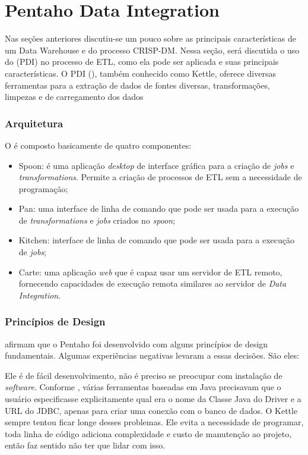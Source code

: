 \section{Pentaho Data Integration}
Nas seções anteriores discutiu-se um pouco sobre as principais características de um Data Warehouse e do processo CRISP-DM. Nessa seção, será discutida o uso do \pdi (PDI) no processo de ETL, como ela pode ser aplicada e suas principais características.
O PDI (\textit{\pdi}), também conhecido como Kettle, oferece diversas ferramentas para a extração de dados de fontes diversas, transformações, limpezas e de carregamento dos dados
\subsubsection{Arquitetura}
O \pdi é composto basicamente de quatro componentes:
\begin{itemize}
    \item Spoon: é uma aplicação \textit{desktop} de interface gráfica para a criação de \textit{jobs} e \textit{transformations}. Permite a criação de processos de ETL sem a necessidade de programação;
    \item Pan: uma interface de linha de comando que pode ser usada para a execução de \textit{transformations} e \textit{jobs} criados no \textit{spoon};
    \item Kitchen: interface de linha de comando que pode ser usada para a execução de \textit{jobs};
    \item Carte: uma aplicação \textit{web} que é capaz usar um servidor de ETL remoto, fornecendo capacidades de execução remota similares ao servidor de \textit{Data Integration}.
\end{itemize}

\subsubsection{Princípios de Design}
 afirmam que o Pentaho foi desenvolvido com alguns princípios de design fundamentais. Algumas experiências negativas levaram a essas decisões. São eles:

Ele é de fácil desenvolvimento, não é preciso se preocupar com instalação de \textit{software}. Conforme , várias ferramentas baseadas em Java precisavam que o usuário especificasse explicitamente qual era o nome da Classe Java do Driver e a URL do JDBC, apenas para criar uma conexão com o banco de dados. O Kettle sempre tentou ficar longe desses problemas. Ele evita a necessidade de programar, toda linha de código adiciona complexidade e custo de manutenção ao projeto, então faz sentido não ter que lidar com isso.

